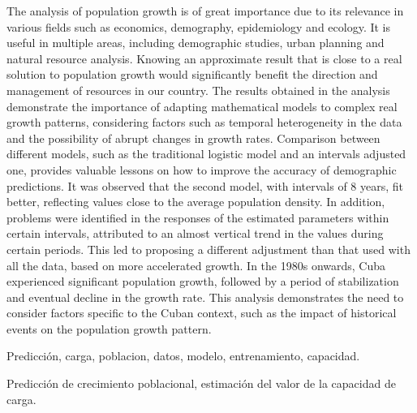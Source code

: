 \documentclass[a4paper,10pt,twocolumn]{article}
\begin{document}
\vspace{0.5cm}

\begin{enabstract}

	The analysis of population growth is of great importance due to its relevance in various fields such as economics, demography, epidemiology and ecology. It is useful in multiple areas, including demographic studies, urban planning and natural resource analysis. Knowing an approximate result that is close to a real solution to population growth would significantly benefit the direction and management of resources in our country. The results obtained in the analysis demonstrate the importance of adapting mathematical models to complex real growth patterns, considering factors such as temporal heterogeneity in the data and the possibility of abrupt changes in growth rates. Comparison between different models, such as the traditional logistic model and an intervals adjusted one, provides valuable lessons on how to improve the accuracy of demographic predictions. It was observed that the second model, with intervals of 8 years, fit better, reflecting values ​​close to the average population density. In addition, problems were identified in the responses of the estimated parameters within certain intervals, attributed to an almost vertical trend in the values ​​during certain periods. This led to proposing a different adjustment than that used with all the data, based on more accelerated growth. In the 1980s onwards, Cuba experienced significant population growth, followed by a period of stabilization and eventual decline in the growth rate. This analysis demonstrates the need to consider factors specific to the Cuban context, such as the impact of historical events on the population growth pattern.
\end{enabstract}

\begin{keywords}
	Predicción,
	carga,
	poblacion,
	datos,
	modelo,
	entrenamiento,
	capacidad.
\end{keywords}

\begin{topics}
	Predicción de crecimiento poblacional, estimación del valor de la capacidad de carga.
\end{topics}
\end{document}
